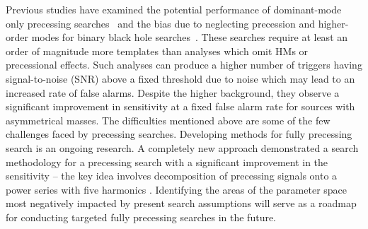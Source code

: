 
Previous studies have examined the potential performance of dominant-mode only precessing searches~\cite{Harry:2016ijz} and the bias due to neglecting precession and higher-order modes for binary black hole searches~\cite{Harry:2017weg, Chandra:2022ixv, CalderonBustillo:2016rlt}. These searches require at least an order of magnitude more templates than analyses which omit HMs or precessional effects. Such analyses can produce a higher number of triggers having signal-to-noise (SNR) above a fixed threshold due to noise which may lead to an increased rate of false alarms. Despite the higher background, they observe a significant improvement in sensitivity at a fixed false alarm rate for sources with asymmetrical masses. The difficulties mentioned above are some of the few challenges faced by precessing searches. Developing methods for fully precessing search is an ongoing research. A completely new approach demonstrated a search methodology for a precessing search with a significant improvement in the sensitivity \cite{McIsaac:2023ijd} -- the key idea involves decomposition of precessing signals onto a power series with five harmonics \cite{Fairhurst:2019vut,McIsaac:2023ijd}. Identifying the areas of the parameter space most negatively impacted by present search assumptions will serve as a roadmap for conducting targeted fully precessing searches in the future.

